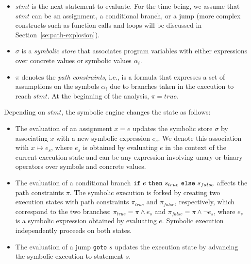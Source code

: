 \begin{itemize}

\item $stmt$ is the next statement to evaluate. For the time being, we assume that $stmt$ can be an assignment, a conditional branch, or a jump (more complex constructs such as function calls and loops will be discussed in  Section~\ref{se:path-explosion}).


\item $\sigma$ is a {\em symbolic store} that associates program variables with either expressions over concrete values or symbolic values $\alpha_i$.

\item $\pi$ denotes the {\em path constraints}, i.e., is a formula that expresses a set of assumptions on the symbols $\alpha_i$ due to branches taken in the execution to reach $stmt$. At the beginning of the analysis, $\pi=true$.

\end{itemize}

\noindent Depending on $stmt$, the symbolic engine changes the state as follows:

\begin{itemize}[topsep=4pt] %
  \item The evaluation of an assignment $x=e$ updates the symbolic store $\sigma$ by associating $x$ with a new symbolic expression $e_s$. We denote this association with $x\mapsto e_s$, where $e_s$ is obtained by evaluating $e$ in the context of the current execution state and  can be any expression involving unary or binary operators over symbols and concrete values.
  

  \item The evaluation of a conditional branch ${\tt if}~e~{\tt then}~s_{true}~{\tt else}~s_{false}$ affects the path constraints $\pi$. The symbolic execution is forked by creating two execution states with path constraints $\pi_{true}$ and $\pi_{false}$, respectively, which correspond to the two branches: $\pi_{true}=\pi \wedge e_s$ and $\pi_{false}=\pi \wedge \neg e_s$, where $e_s$ is a symbolic expression obtained by evaluating $e$. 
    Symbolic execution independently proceeds on both states.

  \item The evaluation of a jump {\tt goto} $s$ updates the execution state by advancing the symbolic execution to statement $s$. 
\end{itemize}

